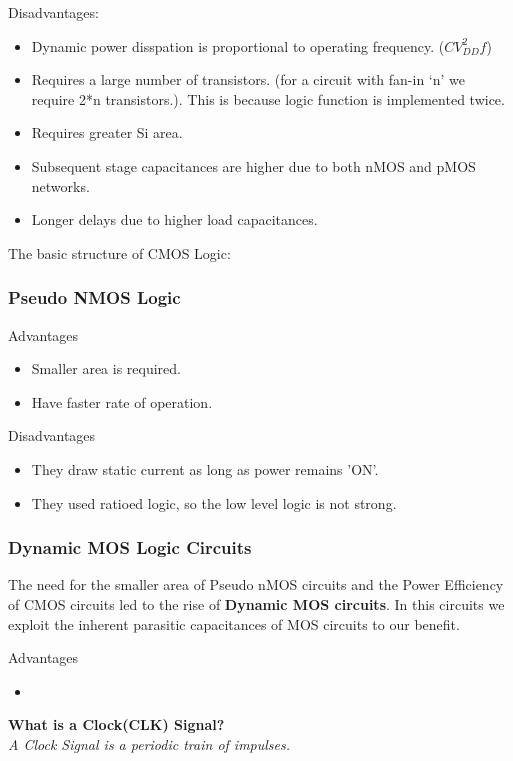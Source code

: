 \documentclass[12pt, letterpaper]{article}
\begin{document}
Disadvantages:
\begin{itemize}
    \item Dynamic power disspation is proportional to operating frequency. ($CV_{DD}^2 f$)
    \item Requires a large number of transistors. (for a circuit with fan-in ‘n’ we require 2*n transistors.). This is because logic function is implemented twice.
    \item Requires greater Si area.
    \item Subsequent stage capacitances are higher due to both nMOS and pMOS networks.
    \item Longer delays due to higher load capacitances.
\end{itemize}

The basic structure of CMOS Logic:

\subsubsection{Pseudo NMOS Logic}

Advantages
\begin{itemize}
    \item Smaller area is required.
    \item Have faster rate of operation.
\end{itemize}

Disadvantages
\begin{itemize}
    \item They draw static current as long as power remains 'ON'.
    \item They used ratioed logic, so the low level logic is not strong.
\end{itemize}

\subsubsection{Dynamic MOS Logic Circuits}
The need for the smaller area of Pseudo nMOS circuits and the Power Efficiency of CMOS circuits led to the rise of \textbf{Dynamic MOS circuits}. In this circuits we exploit the inherent parasitic capacitances of MOS circuits to our benefit.

Advantages
\begin{itemize}
    \item 
\end{itemize}

\textbf{What is a Clock(CLK) Signal?} \\
\textit{A Clock Signal is a periodic train of impulses.}
\end{document}

